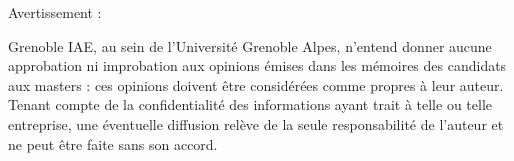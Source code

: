 \vspace*{7cm}
\begin{center}
Avertissement :\\
\end{center}
Grenoble IAE, au sein de l'Université Grenoble Alpes, n'entend donner aucune approbation ni improbation aux opinions émises dans les mémoires des candidats aux masters : ces opinions doivent être considérées comme propres à leur auteur.\\
Tenant compte de la confidentialité des informations ayant trait à telle ou telle entreprise, une éventuelle diffusion relève de la seule responsabilité de l'auteur et ne peut être faite sans son accord.\\
\newpage